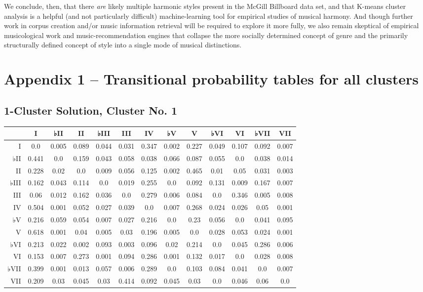 We conclude, then, that there \emph{are} likely multiple harmonic styles present in the McGill Billboard data set, and that K-means cluster analysis is a helpful (and not particularly difficult) machine-learning tool for empirical studies of musical harmony. And though further work in corpus creation and\slash or music information retrieval will be required to explore it more fully, we also remain skeptical of empirical musicological work and music-recommendation engines that collapse the more socially determined concept of genre and the primarily structurally defined concept of style into a single mode of musical distinctions.

\chapter{Appendix 1 – Transitional probability tables for all clusters}
\label{appendix1–transitionalprobabilitytablesforallclusters}

\section{1-Cluster Solution, Cluster No. 1}
\label{1-clustersolutionclusterno.1}

\begin{table}[htbp]
\begin{minipage}{\linewidth}
\setlength{\tymax}{0.5\linewidth}
\centering
\small
\begin{tabulary}{\textwidth}{@{}RCCCCCCCCCCCC@{}} \toprule
&I&♭II&II&♭III&III&IV&♭V&V&♭VI&VI&♭VII&VII\\
\midrule
I&0.0&0.005&0.089&0.044&0.031&0.347&0.002&0.227&0.049&0.107&0.092&0.007\\
♭II&0.441&0.0&0.159&0.043&0.058&0.038&0.066&0.087&0.055&0.0&0.038&0.014\\
II&0.228&0.02&0.0&0.009&0.056&0.125&0.002&0.465&0.01&0.05&0.031&0.003\\
♭III&0.162&0.043&0.114&0.0&0.019&0.255&0.0&0.092&0.131&0.009&0.167&0.007\\
III&0.06&0.012&0.162&0.036&0.0&0.279&0.006&0.084&0.0&0.346&0.005&0.008\\
IV&0.504&0.001&0.052&0.027&0.039&0.0&0.007&0.268&0.024&0.026&0.05&0.001\\
♭V&0.216&0.059&0.054&0.007&0.027&0.216&0.0&0.23&0.056&0.0&0.041&0.095\\
V&0.618&0.001&0.04&0.005&0.03&0.196&0.005&0.0&0.028&0.053&0.024&0.001\\
♭VI&0.213&0.022&0.002&0.093&0.003&0.096&0.02&0.214&0.0&0.045&0.286&0.006\\
VI&0.153&0.007&0.273&0.001&0.094&0.286&0.001&0.132&0.017&0.0&0.028&0.008\\
♭VII&0.399&0.001&0.013&0.057&0.006&0.289&0.0&0.103&0.084&0.041&0.0&0.007\\
VII&0.209&0.03&0.045&0.03&0.414&0.092&0.045&0.03&0.0&0.046&0.06&0.0\\

\bottomrule

\end{tabulary}
\end{minipage}
\end{table}

